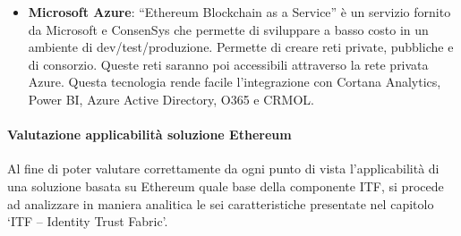 \begin{itemize}
    \item \textbf{Microsoft Azure}: “Ethereum Blockchain as a Service” è un servizio fornito da Microsoft e ConsenSys che permette di sviluppare a basso costo in un ambiente di dev/test/produzione. Permette di creare reti private, pubbliche e di consorzio. Queste reti saranno poi accessibili attraverso la rete privata Azure. Questa tecnologia rende facile l’integrazione con Cortana Analytics, Power BI, Azure Active Directory, O365 e CRMOL.
\end{itemize}

\paragraph{Valutazione applicabilità soluzione Ethereum}
Al fine di poter valutare correttamente da ogni punto di vista l’applicabilità di una soluzione basata su Ethereum quale base della componente ITF, si procede ad analizzare in maniera analitica le sei caratteristiche presentate nel capitolo ‘ITF – Identity Trust Fabric’.

